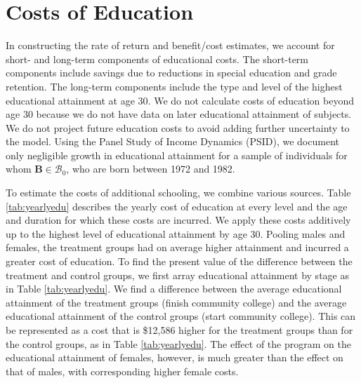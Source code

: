 \section{Costs of Education} \label{appendix:education}

\noindent In constructing the rate of return and benefit/cost estimates, we account for short- and long-term components of educational costs. The short-term components include savings due to reductions in special education and grade retention. The long-term components include the type and level of the highest educational attainment at age 30. We do not calculate costs of education beyond age 30 because we do not have data on later educational attainment of subjects. We do not project  future education costs to avoid adding further uncertainty to the model. Using the Panel Study of Income Dynamics (PSID), we document only negligible growth in educational attainment for a sample of individuals for whom $\bm{B} \in \mathcal{B}_0$, who are born between 1972 and 1982.

\noindent To estimate the costs of additional schooling, we combine various sources. Table \ref{tab:yearlyedu}  describes the yearly cost of education at every level and the age and duration for which these costs are incurred. We apply these costs additively up to the highest level of educational attainment by age 30. Pooling males and females, the treatment groups had on average higher attainment and incurred a greater cost of education. To find the present value of the difference between the treatment and control groups, we first array educational attainment by stage as in Table \ref{tab:yearlyedu}. We find a difference between the average educational attainment of the treatment groups (finish community college) and the average educational attainment of the control groups (start community college). This can be represented as a cost that is \$12,586 higher for the treatment groups than for the control groups, as in Table \ref{tab:yearlyedu}. The effect of the program on the educational attainment of females, however, is much greater than the effect on that of males, with corresponding higher female costs.

